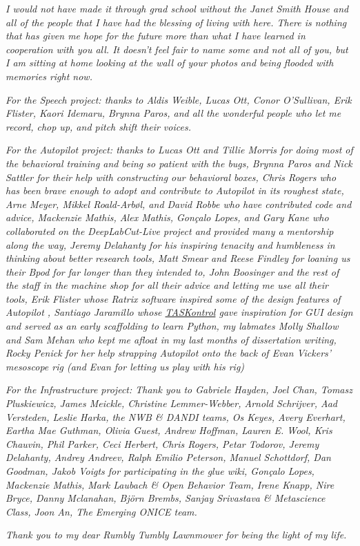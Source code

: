 \begin{acknowledgements}
\textit{I would not have made it through grad school without the Janet Smith House and all of the people that I have had the blessing of living with here. There is nothing that has given me hope for the future more than what I have learned in cooperation with you all. It doesn't feel fair to name some and not all of you, but I am sitting at home looking at the wall of your photos and being flooded with memories right now.}

\textit{For the Speech project: thanks to Aldis Weible, Lucas Ott, Conor O'Sullivan, Erik Flister, Kaori Idemaru, Brynna Paros, and all the wonderful people who let me record, chop up, and pitch shift their voices.}

\textit{For the Autopilot project: thanks to Lucas Ott and Tillie Morris for doing most of the behavioral training and being so patient with the bugs, Brynna Paros and Nick Sattler for their help with constructing our behavioral boxes, Chris Rogers who has been brave enough to adopt and contribute to Autopilot in its roughest state, Arne Meyer, Mikkel Roald-Arbøl, and David Robbe who have contributed code and advice, Mackenzie Mathis, Alex Mathis, Gonçalo Lopes, and Gary Kane who collaborated on the DeepLabCut-Live project and provided many a mentorship along the way, Jeremy Delahanty for his inspiring tenacity and humbleness in thinking about better research tools, Matt Smear and Reese Findley for loaning us their Bpod for far longer than they intended to, John Boosinger and the rest of the staff in the machine shop for all their advice and letting me use all their tools, Erik Flister whose Ratrix software inspired some of the design features of Autopilot \citep{meierCollinearFeaturesImpair2011}, Santiago Jaramillo whose \href{https://github.com/sjara/taskontrol}{TASKontrol}\citep{jaramilloTASKontrol2022} gave inspiration for GUI design and served as an early scaffolding to learn Python, my labmates Molly Shallow and Sam Mehan who kept me afloat in my last months of dissertation writing, Rocky Penick for her help strapping Autopilot onto the back of Evan Vickers' mesoscope rig (and Evan for letting us play with his rig)}

\textit{For the Infrastructure project: Thank you to Gabriele Hayden, Joel Chan, Tomasz Pluskiewicz, James Meickle, Christine Lemmer-Webber, Arnold Schrijver, Aad Versteden, Leslie Harka, the NWB \& DANDI teams, Os Keyes, Avery Everhart, Eartha Mae Guthman, Olivia Guest, Andrew Hoffman, Lauren E. Wool, Kris Chauvin, Phil Parker, Ceci Herbert, Chris Rogers, Petar Todorov, Jeremy Delahanty, Andrey Andreev, Ralph Emilio Peterson, Manuel Schottdorf, Dan Goodman, Jakob Voigts for participating in the glue wiki, Gonçalo Lopes, Mackenzie Mathis, Mark Laubach \& Open Behavior Team, Irene Knapp, Nire Bryce, Danny Mclanahan, Björn Brembs, Sanjay Srivastava \& Metascience Class, Joon An, The Emerging ONICE team.}

\textit{Thank you to my dear Rumbly Tumbly Lawnmower for being the light of my life.}

\end{acknowledgements}